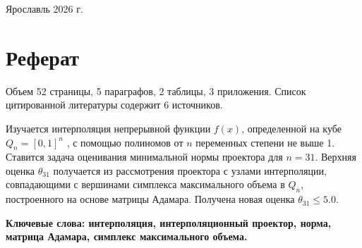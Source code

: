 \documentclass[a4paper,12pt]{article}
\theoremstyle{indented}
\begin{document}
\vspace{0.5cm}
\begin{center}
Ярославль 2026 г.
\end{center}
\newpage

\section*{Реферат}

Объем 52 страницы, 5 параграфов, 2 таблицы, 3 приложения. Список цитированной литературы содержит 6 источников.
\par
Изучается интерполяция непрерывной функции $f(x)$, определенной на кубе
$Q_n = [0, 1]^n$ , с помощью полиномов от $n$ переменных степени не выше 1. Ставится
задача оценивания минимальной нормы проектора для $n = 31$. Верхняя оценка $\theta_{31}$
получается из рассмотрения проектора с узлами интерполяции, совпадающими с
вершинами симплекса максимального объема в $Q_n$, построенного на основе матрицы Адамара. Получена новая оценка $\theta_{31} \leq 5.0$.
\par
\textbf{Ключевые слова: интерполяция, интерполяционный проектор, норма, матрица Адамара, симплекс максимального объема.}

\newpage

\pagestyle{plain}
\tableofcontents

\newpage



\end{document}
